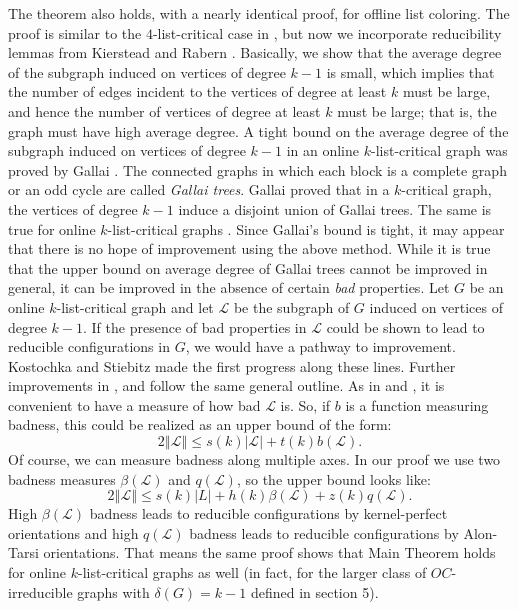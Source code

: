 \documentclass[12pt]{article}
\theoremstyle{plain}
\theoremstyle{definition}
\theoremstyle{remark}
\newcommand{\fancy}[1]{\mathcal{#1}}
\renewcommand{\L}{\fancy{L}}
\newcommand{\card}[1]{\left|#1\right|}
\newcommand{\size}[1]{\left\Vert#1\right\Vert}
\begin{document}
The theorem also holds, with a nearly identical proof, for offline list coloring.  The proof is similar to the $4$-list-critical case in \cite{Better4ListCriticalBound}, 
but now we incorporate reducibility lemmas from Kierstead and Rabern \cite{OreVizing}.  
Basically, we show that the average degree of the subgraph induced on vertices of degree $k-1$ is small, which implies that the number of edges incident to the vertices 
of degree at least $k$ must be large,
and hence the number of vertices of degree at least $k$ must be large; that is, the graph must have high average degree.  
A tight bound on the average degree of the subgraph induced on vertices of degree $k-1$ in an online $k$-list-critical graph was proved by Gallai \cite{gallai1963kritische}.  
The connected graphs in which each block is a complete graph or an odd cycle are called \emph{Gallai trees}.  
Gallai \cite{gallai1963kritische} proved that in a $k$-critical graph, the vertices of degree $k-1$ induce a disjoint union of Gallai trees.  
The same is true for online $k$-list-critical graphs \cite{borodin1977criterion, erdos1979choosability, schauz2009mr}.  
Since Gallai's bound is tight, it may appear that there is no hope of improvement using the above method.  
While it is true that the upper bound on average degree of Gallai trees cannot be improved in general, it can be improved in the absence of certain \emph{bad} properties.  
Let $G$ be an online $k$-list-critical graph and let $\L$ be the subgraph of $G$ induced on vertices of degree $k-1$.
If the presence of bad properties in $\L$ could be shown to lead to reducible configurations in $G$, we would have a pathway to improvement.  
Kostochka and Stiebitz \cite{kostochkastiebitzedgesincriticalgraph}
made the first progress along these lines.  Further improvements in \cite{OreVizing}, \cite{DischargingLowerBound} and \cite{Better4ListCriticalBound} follow the same general outline.  
As in \cite{DischargingLowerBound} and \cite{Better4ListCriticalBound}, it is convenient to have a measure of how bad $\L$ is.  So, if $b$ is a function measuring badness, this could be realized as
an upper bound of the form:
\[2\size{\L} \le s(k)\card{\L} + t(k)b(\L).\]
Of course, we can measure badness along multiple axes.  In our proof we use two badness measures $\beta(\L)$ and $q(\L)$, so the upper bound looks like:
\[2\size{\L} \le s(k)\card{L} + h(k)\beta(\L) + z(k)q(\L).\]
High $\beta(\L)$ badness leads to reducible configurations by kernel-perfect orientations and high $q(\L)$ badness leads to reducible configurations by Alon-Tarsi orientations.
That means the same proof shows that Main Theorem holds for online $k$-list-critical graphs as well (in fact, for the larger class of $OC$-irreducible graphs with $\delta(G) = k-1$ defined in section 5).
\end{document}
